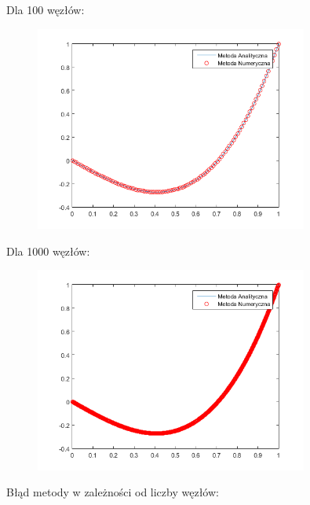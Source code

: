 \newpage

Dla 100 węzłów:

\begin{figure}[!ht]
	\begin{center}
		\includegraphics[width=0.8\textwidth]{Lab3/charts/zad2/100.png}
	\end{center}
\end{figure}

Dla 1000 węzłów:

\begin{figure}[!ht]
	\begin{center}
		\includegraphics[width=0.8\textwidth]{Lab3/charts/zad2/1000.png}
	\end{center}
\end{figure}

\newpage

Błąd metody w zależności od liczby węzłów:

